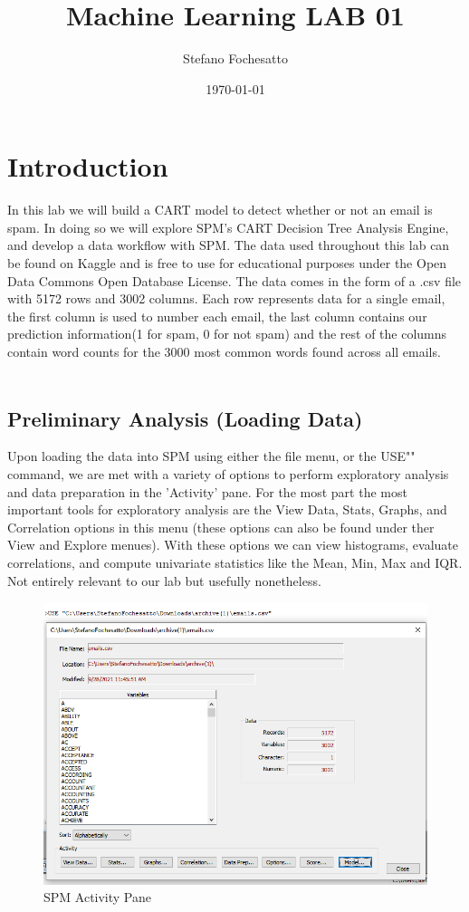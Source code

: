 \documentclass[12pt]{amsart}
\title{Machine Learning LAB 01}
\author{Stefano Fochesatto}
\date{\today} %
\begin{document}
\doublespacing %


\maketitle

\section{Introduction}%
In this lab we will build a CART model to detect whether or not an email is spam. In doing so we will 
explore SPM's CART Decision Tree Analysis Engine, and develop a data workflow with SPM. The data used throughout this lab 
can be found on Kaggle and is free to use for educational purposes under the Open Data Commons Open Database License.
The data comes in the form of a .csv file with 5172 rows and 3002 columns. Each row represents data for a single email, the first 
column is used to number each email, the last column contains our prediction information(1 for spam, 0 for not spam) and the rest of the columns
contain word counts for the 3000 most common words found across all emails. \\\\


\subsection*{Preliminary Analysis (Loading Data)}
Upon loading the data into SPM using either the file menu, or the USE"" command, we are met with a variety of options 
to perform exploratory analysis and data preparation in the 'Activity' pane. For the most part the most important tools for 
exploratory analysis are the View Data, Stats, Graphs, and Correlation options in this menu (these options can also be found under 
ther View and Explore menues). With these options we can view histograms, 
evaluate correlations, and compute univariate statistics like the Mean, Min, Max and IQR. Not entirely relevant to 
our lab but usefully nonetheless. \\
\begin{figure}[H]
    \begin{center}
    \caption{SPM Activity Pane}
    \includegraphics[width=.75\linewidth]{fig1.png}
    \end{center}
    \end{figure}
\end{document}
